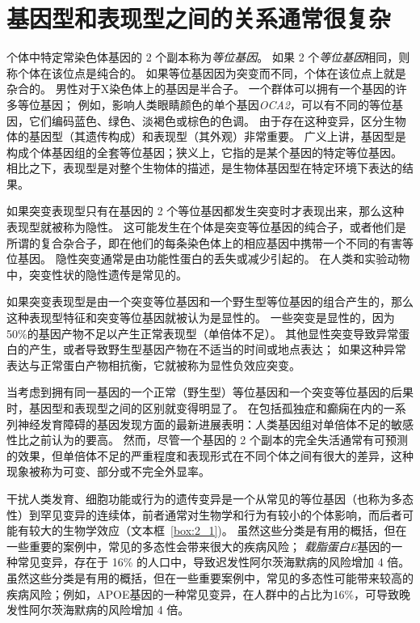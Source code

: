 \section{基因型和表现型之间的关系通常很复杂}

个体中特定常染色体基因的 2 个副本称为\textit{等位基因}。
如果 2 个\textit{等位基因}相同，则称个体在该位点是纯合的。
如果等位基因因为突变而不同，个体在该位点上就是杂合的。
男性对于X染色体上的基因是半合子。
一个群体可以拥有一个基因的许多等位基因；
例如，影响人类眼睛颜色的单个基因\textit{OCA2}，可以有不同的等位基因，它们编码蓝色、绿色、淡褐色或棕色的色调。
由于存在这种变异，区分生物体的基因型（其遗传构成）和表现型（其外观）非常重要。
广义上讲，基因型是构成个体基因组的全套等位基因；狭义上，它指的是某个基因的特定等位基因。
相比之下，表现型是对整个生物体的描述，是生物体基因型在特定环境下表达的结果。


如果突变表现型只有在基因的 2 个等位基因都发生突变时才表现出来，那么这种表现型就被称为隐性。
这可能发生在个体是突变等位基因的纯合子，或者他们是所谓的复合杂合子，即在他们的每条染色体上的相应基因中携带一个不同的有害等位基因。
隐性突变通常是由功能性蛋白的丢失或减少引起的。
在人类和实验动物中，突变性状的隐性遗传是常见的。


如果突变表现型是由一个突变等位基因和一个野生型等位基因的组合产生的，那么这种表现型特征和突变等位基因就被认为是显性的。
一些突变是显性的，因为50\%的基因产物不足以产生正常表现型（单倍体不足）。
其他显性突变导致异常蛋白的产生，或者导致野生型基因产物在不适当的时间或地点表达；
如果这种异常表达与正常蛋白产物相抗衡，它就被称为显性负效应突变。



当考虑到拥有同一基因的一个正常（野生型）等位基因和一个突变等位基因的后果时，基因型和表现型之间的区别就变得明显了。
在包括孤独症和癫痫在内的一系列神经发育障碍的基因发现方面的最新进展表明：人类基因组对单倍体不足的敏感性比之前认为的要高。
然而，尽管一个基因的 2 个副本的完全失活通常有可预测的效果，但单倍体不足的严重程度和表现形式在不同个体之间有很大的差异，这种现象被称为可变、部分或不完全外显率。



干扰人类发育、细胞功能或行为的遗传变异是一个从常见的等位基因（也称为多态性）到罕见变异的连续体，前者通常对生物学和行为有较小的个体影响，而后者可能有较大的生物学效应（文本框~\ref{box:2_1})。
虽然这些分类是有用的概括，但在一些重要的案例中，常见的多态性会带来很大的疾病风险；
\textit{载脂蛋白E}基因的一种常见变异，存在于 16\% 的人口中，导致迟发性阿尔茨海默病的风险增加 4 倍。
虽然这些分类是有用的概括，但在一些重要案例中，常见的多态性可能带来较高的疾病风险；例如，APOE基因的一种常见变异，在人群中的占比为16\%，可导致晚发性阿尔茨海默病的风险增加 4 倍。


